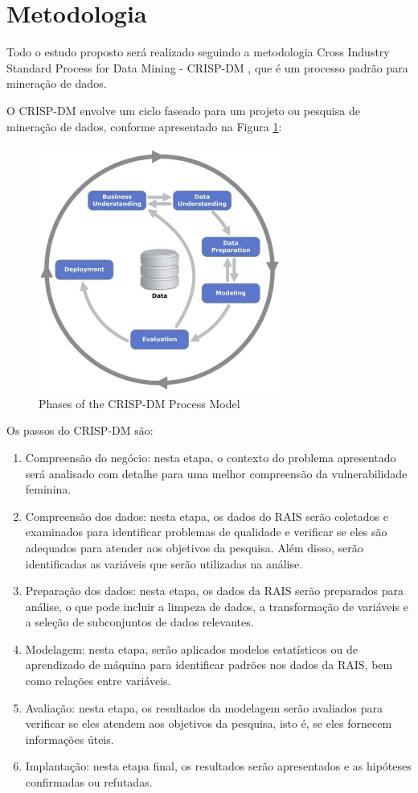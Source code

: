 \section{Metodologia}

Todo o estudo proposto será realizado seguindo a metodologia Cross Industry Standard Process for Data Mining - CRISP-DM \cite{chapman2000crisp}, que é um processo padrão para mineração de dados.

O CRISP-DM envolve um ciclo faseado para um projeto ou pesquisa de mineração de dados, conforme apresentado na Figura \ref{fig1}:

\begin{figure}[htbp]
	\centerline{
		\includegraphics[width=80mm,scale=0.8]{assets/crispdm.jpg}
	}
	\caption{Phases of the CRISP-DM Process Model}
	\label{fig1}
\end{figure}

Os passos do CRISP-DM são:

\begin{enumerate}
	\item Compreensão do negócio: nesta etapa, o contexto do problema apresentado será analisado com detalhe para uma melhor compreensão da vulnerabilidade feminina.
	\item Compreensão dos dados: nesta etapa, os dados do RAIS serão coletados e examinados para identificar problemas de qualidade e verificar se eles são adequados para atender aos objetivos da pesquisa. Além disso, serão identificadas as variáveis que serão utilizadas na análise.
	\item Preparação dos dados: nesta etapa, os dados da RAIS serão preparados para análise, o que pode incluir a limpeza de dados, a transformação de variáveis e a seleção de subconjuntos de dados relevantes. 
	\item Modelagem: nesta etapa, serão aplicados modelos estatísticos ou de aprendizado de máquina para identificar padrões nos dados da RAIS, bem como relações entre variáveis.
	\item Avaliação: nesta etapa, os resultados da modelagem serão avaliados para verificar se eles atendem aos objetivos da pesquisa, isto é, se eles fornecem informações úteis.
	\item Implantação: nesta etapa final, os resultados serão apresentados e as hipóteses confirmadas ou refutadas.     	      	      	      	      	      
\end{enumerate}

  